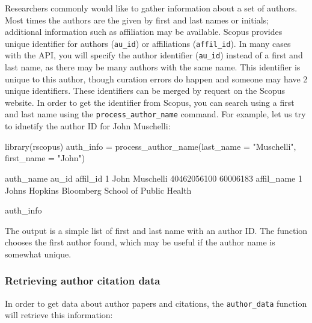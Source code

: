 Researchers commonly would like to gather information about a set of
authors. Most times the authors are the given by first and last names or
initials; additional information such as affiliation may be available.
Scopus provides unique identifier for authors (\texttt{au\_id}) or
affiliations (\texttt{affil\_id}). In many cases with the API, you will
specify the author identifier (\texttt{au\_id}) instead of a first and
last name, as there may be many authors with the same name. This
identifier is unique to this author, though curation errors do happen
and someone may have 2 unique identifiers. These identifiers can be
merged by request on the Scopus website. In order to get the identifier
from Scopus, you can search using a first and last name using the
\texttt{process\_author\_name} command. For example, let us try to
idnetify the author ID for John Muschelli:

\begin{Schunk}
\begin{Sinput}
library(rscopus)
auth_info = process_author_name(last_name = "Muschelli", first_name = "John")
\end{Sinput}
\begin{Soutput}
       auth_name       au_id affil_id
1 John Muschelli 40462056100 60006183
                                       affil_name
1 Johns Hopkins Bloomberg School of Public Health
\end{Soutput}
\begin{Sinput}
auth_info
\end{Sinput}
\end{Schunk}

The output is a simple list of first and last name with an author ID.
The function chooses the first author found, which may be useful if the
author name is somewhat unique.

\hypertarget{retrieving-author-citation-data}{%
\subsubsection{Retrieving author citation
data}\label{retrieving-author-citation-data}}

In order to get data about author papers and citations, the
\texttt{author\_data} function will retrieve this information:

